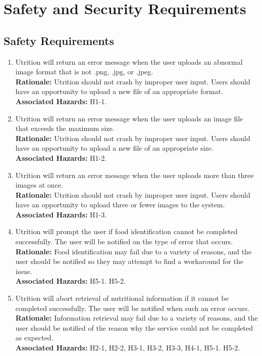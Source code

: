 \documentclass{article}
\begin{document}
\section{Safety and Security Requirements}
\subsection{Safety Requirements}
\begin{enumerate}[{SR}1.]
	\item Utrition will return an error message when the user uploads an abnormal 
	image format that is not .png, .jpg, or .jpeg. \\
	\textbf{Rationale:}  Utrition should not crash by improper user 
	input. Users should have an opportunity to upload a new file of an appropriate format.\\	
	\textbf{Associated Hazards:} H1-1.
	
	\item Utrition will return an error message when the user uploads an image file that exceeds the maximum size. \\
	\textbf{Rationale:}  Utrition should not crash by improper user 
	input. Users should have an opportunity to upload a new file of an appropriate size.\\	
	\textbf{Associated Hazards:} H1-2.
	
	\item Utrition will return an error message when the user uploads more than three images at once. \\
	\textbf{Rationale:}  Utrition should not crash by improper user 
	input. Users should have an opportunity to upload three or fewer images to the system.\\	
	\textbf{Associated Hazards:} H1-3.
	
	\item Utrition will prompt the user if food identification cannot 
	be completed successfully. The user will be notified on the type of error 
	that occurs. \\
	\textbf{Rationale:}  Food identification may fail due to a variety of 
	reasons, and the user should be notified so they may attempt to find a  
	workaround for the issue. \\	
	\textbf{Associated Hazards:} H5-1. H5-2.
	
	\item Utrition will abort retrieval of nutritional information if it cannot 
	be completed successfully. The user will be notified when such 
	an error occurs. \\
	\textbf{Rationale:}  Information retrieval may fail due to a variety of 
	reasons, and the user should be notified of the reason why the service 
	could not be completed as expected.\\	
	\textbf{Associated Hazards:} H2-1, H2-2, H3-1, H3-2, H3-3, H4-1, H5-1. H5-2.
	

\end{enumerate}
\end{document}
